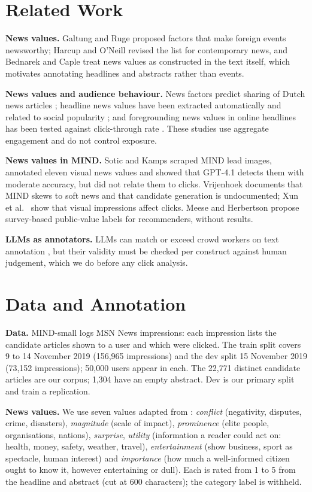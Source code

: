 \section{Related Work}
\textbf{News values.} Galtung and Ruge \cite{galtung1965} proposed factors that make foreign events newsworthy; Harcup and O'Neill \cite{harcup2017} revised the list for contemporary news, and Bednarek and Caple \cite{bednarek2017} treat news values as constructed in the text itself, which motivates annotating headlines and abstracts rather than events.

\textbf{News values and audience behaviour.} News factors predict sharing of Dutch news articles \cite{trilling2017}; headline news values have been extracted automatically and related to social popularity \cite{piotrkowicz2017}; and foregrounding news values in online headlines has been tested against click-through rate \cite{lagerwerf2021}. These studies use aggregate engagement and do not control exposure.

\textbf{News values in MIND.} Sotic and Kamps \cite{sotic2025} scraped MIND lead images, annotated eleven visual news values and showed that GPT-4.1 detects them with moderate accuracy, but did not relate them to clicks. Vrijenhoek \cite{vrijenhoek2023} documents that MIND skews to soft news and that candidate generation is undocumented; Xun et al.\ \cite{xun2021} show that visual impressions affect clicks. Meese and Herbertson \cite{meese2025} propose survey-based public-value labels for recommenders, without results.

\textbf{LLMs as annotators.} LLMs can match or exceed crowd workers on text annotation \cite{gilardi2023}, but their validity must be checked per construct against human judgement, which we do before any click analysis.

\section{Data and Annotation}
\textbf{Data.} MIND-small \cite{wu2020mind} logs MSN News impressions: each impression lists the candidate articles shown to a user and which were clicked. The train split covers 9 to 14 November 2019 (156,965 impressions) and the dev split 15 November 2019 (73,152 impressions); 50,000 users appear in each. The 22,771 distinct candidate articles are our corpus; 1,304 have an empty abstract. Dev is our primary split and train a replication.

\textbf{News values.} We use seven values adapted from \cite{harcup2017}: \emph{conflict} (negativity, disputes, crime, disasters), \emph{magnitude} (scale of impact), \emph{prominence} (elite people, organisations, nations), \emph{surprise}, \emph{utility} (information a reader could act on: health, money, safety, weather, travel), \emph{entertainment} (show business, sport as spectacle, human interest) and \emph{importance} (how much a well-informed citizen ought to know it, however entertaining or dull). Each is rated from 1 to 5 from the headline and abstract (cut at 600 characters); the category label is withheld.

